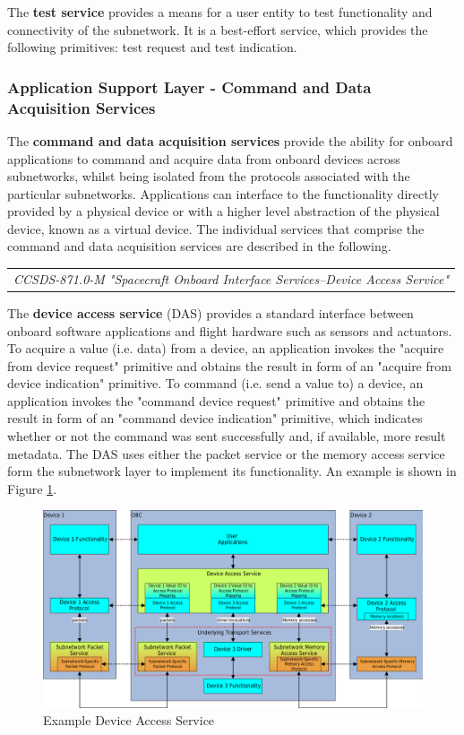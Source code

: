 The \textbf{test service} provides a means for a user entity to test functionality and connectivity of the subnetwork. It is a best-effort service, which provides the following primitives: test request and test indication.

\subsubsection{Application Support Layer - Command and Data Acquisition Services}

The \textbf{command and data acquisition services} provide the ability for onboard applications to command and acquire data from onboard devices across subnetworks, whilst being isolated from the protocols associated with the particular subnetworks. Applications can interface to the functionality directly provided by a physical device or with a higher level abstraction of the physical device, known as a virtual device. The individual services that comprise the command and data acquisition services are described in the following.

\begin{tabular}{l}
\textit{CCSDS-871.0-M "Spacecraft Onboard Interface Services--Device Access Service" \cite{CCSDS-871.0-M}} 
\end{tabular}

The \textbf{device access service} (DAS) provides a standard interface between onboard software applications and flight hardware such as sensors and actuators. To acquire a value (i.e. data) from a device, an application invokes the "acquire from device request" primitive and obtains the result in form of an "acquire from device indication" primitive. To command (i.e. send a value to) a device, an application invokes the "command device request" primitive and obtains the result in form of an "command device indication" primitive, which indicates whether or not the command was sent successfully and, if available, more result metadata. The DAS uses either the packet service or the memory access service form the subnetwork layer to implement its functionality. An example is shown in Figure \ref{fig:Example Device Access Service}.

\begin{figure}[h]
\centering\includegraphics[scale=0.3]{fig/example_device_access_service}
\caption{Example Device Access Service}
\label{fig:Example Device Access Service}
\end{figure}


